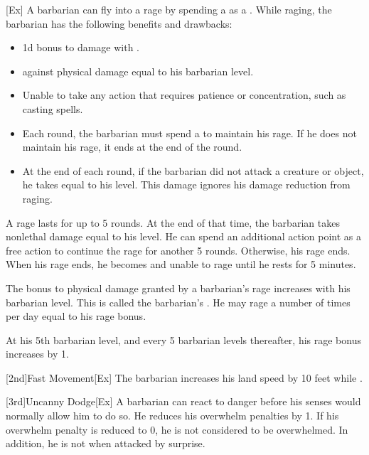         [Ex]\label{Rage}
        A barbarian can fly into a rage by spending a  as a .
        While raging, the barbarian has the following benefits and drawbacks:
        \begin{itemize}
            \item \plus1d bonus to damage with .
            \item {} against physical damage equal to his barbarian level.
            \item Unable to take any action that requires patience or concentration, such as casting spells.
            \item Each round, the barbarian must spend a  to maintain his rage.
                If he does not maintain his rage, it ends at the end of the round.
            \item At the end of each round, if the barbarian did not attack a creature or object, he takes  equal to his level.
                This damage ignores his damage reduction from raging.
        \end{itemize}

        A rage lasts for up to 5 rounds.
        At the end of that time, the barbarian takes nonlethal damage equal to his level.
        He can spend an additional action point as a free action to continue the rage for another 5 rounds.
        Otherwise, his rage ends.
        When his rage ends, he becomes \fatigued and unable to rage until he rests for 5 minutes.

        The bonus to physical damage granted by a barbarian's rage increases with his barbarian level.
        This is called the barbarian's .
        He may rage a number of times per day equal to his rage bonus.

        At his 5th barbarian level, and every 5 barbarian levels thereafter, his rage bonus increases by 1.

        [2nd]{Fast Movement}[Ex]
        The barbarian increases his land speed by 10 feet while \unencumbered.

        [3rd]{Uncanny Dodge}[Ex]
        A barbarian can react to danger before his senses would normally allow him to do so.
        He reduces his overwhelm penalties by 1.
        If his overwhelm penalty is reduced to 0, he is not considered to be overwhelmed.
        In addition, he is not \unaware when attacked by surprise.

